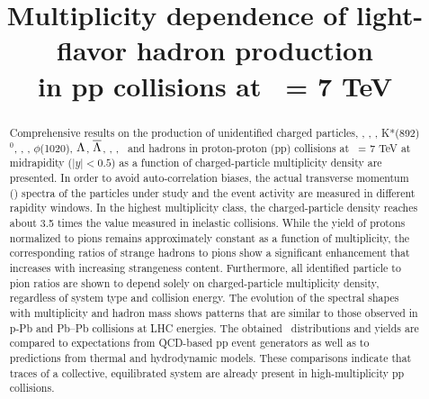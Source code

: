 \documentclass[ALICE,manyauthors]{cernphprep}
\begin{document}
\begin{titlepage}
%
%


\title{Multiplicity dependence of light-flavor hadron production \\ in pp collisions at \s\ = 7 TeV}
%
%

%
%
\begin{abstract} 

Comprehensive results on the production of unidentified charged particles, \pipm, \kapm, \kzero, K*(892)$^{0}$, \p, \pbar, $\phi$(1020), $\Lambda$, $\overline{\Lambda}$, \X, \Ix, \Om\ and \Mo hadrons in proton-proton (pp) collisions at \s\ = 7 TeV at midrapidity ($|y| < 0.5$) as a function of charged-particle multiplicity density are presented. In order to avoid auto-correlation biases, the actual transverse momentum (\pt) spectra of the particles under study and the event activity are measured in different rapidity windows. In the highest multiplicity class, the charged-particle density reaches about 3.5 times the value measured in inelastic collisions. While the yield of protons normalized to pions remains approximately constant as a function of multiplicity, the corresponding ratios of strange hadrons to pions show a significant enhancement that increases with increasing strangeness content. Furthermore, all identified particle to pion ratios are shown to depend solely on charged-particle multiplicity density, regardless of system type and collision energy. 
The evolution of the spectral shapes with multiplicity and hadron mass shows patterns that are similar to those observed in p-Pb and Pb--Pb collisions at LHC energies. The obtained \pt\ distributions and yields are compared to expectations from QCD-based 
pp event generators as well as to predictions from thermal and hydrodynamic models. These comparisons indicate that 
traces of a collective, equilibrated system are already present in high-multiplicity pp collisions. 

\end{abstract}
%
%
\end{titlepage}
\setcounter{page}{2}
%
\end{document}
